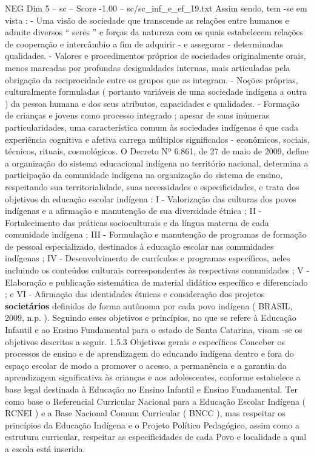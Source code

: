 \begin{textsample}{NEG Dim 5 – sc – Score -1.00 – sc/sc\_inf\_e\_ef\_19.txt}
Assim sendo, tem -se em vista : - Uma visão de sociedade que transcende as relações entre humanos e admite diversos “ seres ” e forças da natureza com os quais estabelecem relações de cooperação e intercâmbio a fim de adquirir - e assegurar - determinadas qualidades. - Valores e procedimentos próprios de sociedades originalmente orais, menos marcadas por profundas desigualdades internas, mais articuladas pela obrigação da reciprocidade entre os grupos que as integram. - Noções próprias, culturalmente formuladas ( portanto variáveis de uma sociedade indígena a outra ) da pessoa humana e dos seus atributos, capacidades e qualidades. - Formação de crianças e jovens como processo integrado ; apesar de suas inúmeras particularidades, uma característica comum às sociedades indígenas é que cada experiência cognitiva e afetiva carrega múltiplos significados - econômicos, sociais, técnicos, rituais, cosmológicos.
O Decreto Nº 6.861, de 27 de maio de 2009, define a organização do sistema educacional indígena no território nacional, determina a participação da comunidade indígena na organização do sistema de ensino, respeitando sua territorialidade, suas necessidades e especificidades, e trata dos objetivos da educação escolar indígena : I - Valorização das culturas dos povos indígenas e a afirmação e manutenção de sua diversidade étnica ; II - Fortalecimento das práticas socioculturais e da língua materna de cada comunidade indígena ; III - Formulação e manutenção de programas de formação de pessoal especializado, destinados à educação escolar nas comunidades indígenas ; IV - Desenvolvimento de currículos e programas específicos, neles incluindo os conteúdos culturais correspondentes às respectivas comunidades ; V - Elaboração e publicação sistemática de material didático específico e diferenciado ; e VI - Afirmação das identidades étnicas e consideração dos projetos \textbf{societários} definidos de forma autônoma por cada povo indígena ( BRASIL, 2009, n.p. ).
Seguindo esses objetivos e princípios, no que se refere à Educação Infantil e ao Ensino Fundamental para o estado de Santa Catarina, visam -se os objetivos descritos a seguir. 1.5.3 Objetivos gerais e específicos Conceber os processos de ensino e de aprendizagem do educando indígena dentro e fora do espaço escolar de modo a promover o acesso, a permanência e a garantia da aprendizagem significativa às crianças e aos adolescentes, conforme estabelece a base legal destinada à Educação no Ensino Infantil e Ensino Fundamental.
Ter como base o Referencial Curricular Nacional para a Educação Escolar Indígena ( RCNEI ) e a Base Nacional Comum Curricular ( BNCC ), mas respeitar os princípios da Educação Indígena e o Projeto Político Pedagógico, assim como a estrutura curricular, respeitar as especificidades de cada Povo e localidade a qual a escola está inserida.

\end{textsample}
